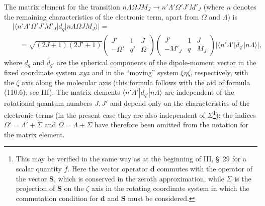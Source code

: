 The matrix element for the transition $n\Lambda\Omega JM_J\to n'\Lambda'\Omega'J'M'_J$ (where $n$ denotes the remaining characteristics of the electronic term, apart from $\Omega$ and $\Lambda$) is
\begin{equation}
\begin{aligned}
&|\langle n'\Lambda'\Omega'J'M'_J|d_q|n\Lambda\Omega JM_J\rangle|={}\\
&\quad=\sqrt{(2J+1)(2J'+1)}
\begin{pmatrix}J'&1&J\\-\Omega'&q'&\Omega\end{pmatrix}
\begin{pmatrix}J'&1&J\\-M'_J&q&M_J\end{pmatrix}
|\langle n'\Lambda'|\bar d_{q'}|n\Lambda\rangle|,
\end{aligned}
\tag{53.11}
\end{equation}
where $d_q$ and $\bar d_{q'}$ are the spherical components of the dipole-moment vector in the fixed coordinate system $xyz$ and in the ``moving'' system $\xi\eta\zeta$, respectively, with the $\zeta$ axis along the molecular axis (this formula follows with the aid of formula (110.6), see III). The matrix elements $\langle n'\Lambda'|\bar d_{q'}|n\Lambda\rangle$ are independent of the rotational quantum numbers $J,J'$ and depend only on the characteristics of the electronic terms (in the present case they are also independent of $\Sigma$\footnote{This may be verified in the same way as at the beginning of III, \S~29 for a scalar quantity $f$. Here the vector operator $\mathbf d$ commutes with the operator of the vector $\mathbf S$, which is conserved in the zeroth approximation, while $\Sigma$ is the projection of $\mathbf S$ on the $\zeta$ axis in the rotating coordinate system in which the commutation condition for $\mathbf d$ and $\mathbf S$ must be considered.}); the indices $\Omega'=\Lambda'+\Sigma$ and $\Omega=\Lambda+\Sigma$ have therefore been omitted from the notation for the matrix element.


